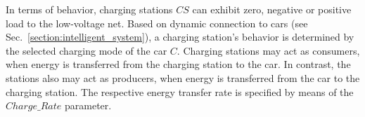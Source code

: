 In terms of behavior, charging stations $CS$ can exhibit zero, negative or positive load to the low-voltage net. Based on dynamic connection to cars (see Sec.~\ref{section:intelligent_system}), a charging station's behavior is determined by the selected charging mode of the car $C$. Charging stations may act as consumers, when energy is transferred from the charging station to the car. In contrast, the stations also may act as producers, when energy is transferred from the car to the charging station. The respective energy transfer rate is specified by means of the $Charge\_Rate$ parameter.